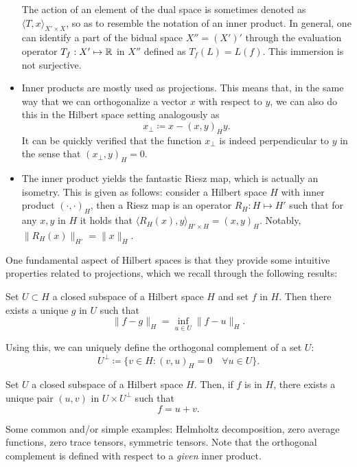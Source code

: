 \begin{itemize}
\begin{equation*}
\end{equation*}
        The action of an element of the dual space is sometimes denoted as $\langle T, x\rangle_{X'\times X}$, so as to resemble the notation of an inner product. In general, one can identify a part of the bidual space $X'' = (X')'$ through the evaluation operator $T_f:X'\mapsto \mathbb{R}$ in $X''$ defined as $T_f(L) = L(f)$. This immersion is not surjective. 
        \item Inner products are mostly used as projections. This means that, in the same way that we can orthogonalize a vector $x$ with respect to $y$, we can also do this in the Hilbert space setting analogously as 
            \begin{equation*}
x_\perp \coloneqq x - (x, y)_H y.
\end{equation*}
        It can be quickly verified that the function $x_\perp$ is indeed perpendicular to $y$ in the sense that $(x_\perp, y)_H=0$. 
        \item The inner product yields the fantastic Riesz map, which is actually an isometry. This is given as follows: consider a Hilbert space $H$ with inner product $(\cdot, \cdot)_H$, then a Riesz map is an operator $R_H: H\mapsto H'$ such that for any $x,y$ in $H$ it holds that $\langle R_H(x), y\rangle_{H'\times H} = (x, y)_H$. Notably, $\|R_H(x)\|_{H'} = \| x \|_H$. 
    \end{itemize}
One fundamental aspect of Hilbert spaces is that they provide some intuitive properties related to projections, which we recall through the following results: 
\begin{theorem}\label{thm:best-approximation}
    Set $U\subset H$ a closed subspace of a Hilbert space $H$ and set $f$ in $H$. Then there exists a unique $g$ in $U$ such that
        \begin{equation*}
\|f - g \|_H = \inf_{u\in U} \| f - u\|_H.
\end{equation*}
\end{theorem}
Using this, we can uniquely define the orthogonal complement of a set $U$: 
    \begin{equation*}
U^\perp \coloneqq \{v\in H: (v, u)_H = 0 \quad\forall u\in U\}.
\end{equation*}
\begin{theorem}\label{thm:orthogonal-decomposition}
    Set $U$ a closed subspace of a Hilbert space $H$. Then, if $f$ is in $H$, there exists a unique pair $(u,v)$ in $U\times U^\perp$ such that 
        \begin{equation*}
f = u + v.
\end{equation*}
\end{theorem}
Some common and/or simple examples: Helmholtz decomposition, zero average functions, zero trace tensors, symmetric tensors. Note that the orthogonal complement is defined with respect to a \emph{given} inner product.

